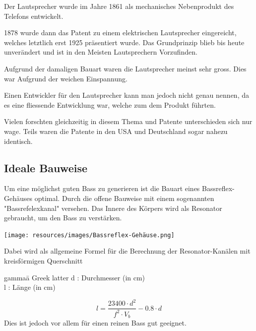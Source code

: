 \documentclass[a4paper,11pt]{report}
\begin{document}
Der Lautsprecher wurde im Jahre 1861 als mechanisches Nebenprodukt des Telefons entwickelt.

1878 wurde dann das Patent zu einem elektrischen Lautsprecher eingereicht, welches letztlich erst 1925 präsentiert wurde.
Das Grundprinzip blieb bis heute unverändert und ist in den Meisten Lautsprechern Vorzufinden. \cite{history_wikipedia}

Aufgrund der damaligen Bauart waren die Lautsprecher meinst sehr gross. Dies war Aufgrund der weichen Einspannung. \cite{history_connect}

Einen Entwickler für den Lautsprecher kann man jedoch nicht genau nennen, da es eine fliessende Entwicklung war, welche zum dem Produkt führten.

Vielen forschten gleichzeitig in diesem Thema und Patente unterschieden sich nur wage. Teils waren die Patente in den USA und Deutschland sogar nahezu identisch.\cite{history_tu_berlin}

\newpage
\subsection{Ideale Bauweise}
\vspace{.5cm}
\noindent \begin{minipage}{0.6\textwidth}
    Um eine möglichst guten Bass zu generieren ist die Bauart eines Bassreflex-Gehäuses optimal. Durch die offene Bauweise mit einem sogenannten "Bassrefelexkanal" versehen.
    Das Innere des Körpers wird als Resonator gebraucht, um den Bass zu verstärken.
\end{minipage}
\hspace{0.1\textwidth}
\begin{minipage}{0.2\textwidth}
    \texttt{[image: resources/images/Bassreflex-Gehäuse.png]}
    \label{fig:bass-reflex}
\end{minipage}
\vspace{.5cm}

Dabei wird als allgemeine Formel für die Berechnung der Resonator-Kanälen mit kreisförmigen Querschnitt
\begin{tabbing}
    gamma\quad\= a Greek latter\kill
    d :    \>Durchmesser (in cm) \\
    l :    \>Länge (in cm)
\end{tabbing}

\begin{equation}
    l = \frac{23400 \cdot d^2}{f^2 \cdot V_b} - 0.8 \cdot d
\end{equation}
Dies ist jedoch vor allem für einen reinen Bass gut geeignet.\cite{bassreflex_wikipedia}
\end{document}
